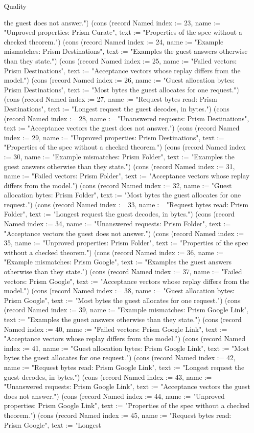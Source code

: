 \begin{lexlean}{Quality}
\begin{semanticmodule}
{the guest does not answer."}) (cons (record Named {index := 23, name := "Unproved properties: Prism Curate", text := "Properties of the spec without a checked theorem."}) (cons (record Named {index := 24, name := "Example mismatches: Prism Destinations", text := "Examples the guest answers otherwise than they state."}) (cons (record Named {index := 25, name := "Failed vectors: Prism Destinations", text := "Acceptance vectors whose replay differs from the model."}) (cons (record Named {index := 26, name := "Guest allocation bytes: Prism Destinations", text := "Most bytes the guest allocates for one request."}) (cons (record Named {index := 27, name := "Request bytes read: Prism Destinations", text := "Longest request the guest decodes, in bytes."}) (cons (record Named {index := 28, name := "Unanswered requests: Prism Destinations", text := "Acceptance vectors the guest does not answer."}) (cons (record Named {index := 29, name := "Unproved properties: Prism Destinations", text := "Properties of the spec without a checked theorem."}) (cons (record Named {index := 30, name := "Example mismatches: Prism Folder", text := "Examples the guest answers otherwise than they state."}) (cons (record Named {index := 31, name := "Failed vectors: Prism Folder", text := "Acceptance vectors whose replay differs from the model."}) (cons (record Named {index := 32, name := "Guest allocation bytes: Prism Folder", text := "Most bytes the guest allocates for one request."}) (cons (record Named {index := 33, name := "Request bytes read: Prism Folder", text := "Longest request the guest decodes, in bytes."}) (cons (record Named {index := 34, name := "Unanswered requests: Prism Folder", text := "Acceptance vectors the guest does not answer."}) (cons (record Named {index := 35, name := "Unproved properties: Prism Folder", text := "Properties of the spec without a checked theorem."}) (cons (record Named {index := 36, name := "Example mismatches: Prism Google", text := "Examples the guest answers otherwise than they state."}) (cons (record Named {index := 37, name := "Failed vectors: Prism Google", text := "Acceptance vectors whose replay differs from the model."}) (cons (record Named {index := 38, name := "Guest allocation bytes: Prism Google", text := "Most bytes the guest allocates for one request."}) (cons (record Named {index := 39, name := "Example mismatches: Prism Google Link", text := "Examples the guest answers otherwise than they state."}) (cons (record Named {index := 40, name := "Failed vectors: Prism Google Link", text := "Acceptance vectors whose replay differs from the model."}) (cons (record Named {index := 41, name := "Guest allocation bytes: Prism Google Link", text := "Most bytes the guest allocates for one request."}) (cons (record Named {index := 42, name := "Request bytes read: Prism Google Link", text := "Longest request the guest decodes, in bytes."}) (cons (record Named {index := 43, name := "Unanswered requests: Prism Google Link", text := "Acceptance vectors the guest does not answer."}) (cons (record Named {index := 44, name := "Unproved properties: Prism Google Link", text := "Properties of the spec without a checked theorem."}) (cons (record Named {index := 45, name := "Request bytes read: Prism Google", text := "Longest }
\end{semanticmodule}
\end{lexlean}
